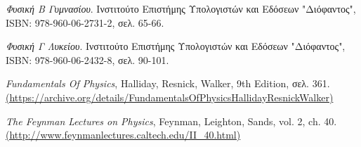 \documentclass[12pt,titlepage]{article}
\begin{document}
\begin{thebibliography}{9}
 \textit{Φυσική Β Γυμνασίου}.
 Ινστιτούτο Επιστήμης Υπολογιστών και Εδόσεων "Διόφαντος", ISBN: 978-960-06-2731-2, σελ. 65-66.

 \textit{Φυσική Γ Λυκείου}.
 Ινστιτούτο Επιστήμης Υπολογιστών και Εδόσεων "Διόφαντος", ISBN: 978-960-06-2432-8, σελ. 90-101.

 \textit{Fundamentals Of Physics}, Halliday, Resnick, Walker, 9th Edition, σελ. 361. \url{(https://archive.org/details/FundamentalsOfPhysicsHallidayResnickWalker)}

 \textit{The Feynman Lectures on Physics}, Feynman, Leighton, Sands, vol. 2, ch. 40. \url{(http://www.feynmanlectures.caltech.edu/II_40.html)}

\end{thebibliography}
\end{document}
